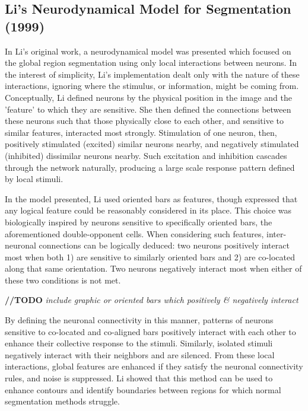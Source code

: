 \documentclass[journal,onecolumn]{IEEEtran}
\begin{document}
\subsection*{Li's Neurodynamical Model for Segmentation (1999)}
In Li's original work, a neurodynamical model was presented which focused on the global region segmentation using only local interactions between neurons. In the interest of simplicity, Li's implementation dealt only with the nature of these interactions, ignoring where the stimulus, or information, might be coming from. Conceptually, Li defined neurons by the physical position in the image and the 'feature' to which they are sensitive. She then defined the connections between these neurons such that those physically close to each other, and sensitive to similar features, interacted most strongly. Stimulation of one neuron, then, positively stimulated (excited) similar neurons nearby, and negatively stimulated (inhibited) dissimilar neurons nearby. Such excitation and inhibition cascades through the network naturally, producing a large scale response pattern defined by local stimuli.

In the model presented, Li used oriented bars as features, though expressed that any logical feature could be reasonably considered in its place. This choice was biologically inspired by neurons sensitive to specifically oriented bars, the aforementioned double-opponent cells. When considering such features, inter-neuronal connections can be logically deduced: two neurons positively interact most when both 1) are sensitive to similarly oriented bars and 2) are co-located along that same orientation. Two neurons negatively interact most when either of these two conditions is not met.

\textbf{//TODO} \textit{include graphic or oriented bars which positively \& negatively interact}

By defining the neuronal connectivity in this manner, patterns of neurons sensitive to co-located and co-aligned bars positively interact with each other to enhance their collective response to the stimuli. Similarly, isolated stimuli negatively interact with their neighbors and are silenced. From these local interactions, global features are enhanced if they satisfy the neuronal connectivity rules, and noise is suppressed. Li showed that this method can be used to enhance contours and identify boundaries between regions for which normal segmentation methods struggle.
\end{document}
